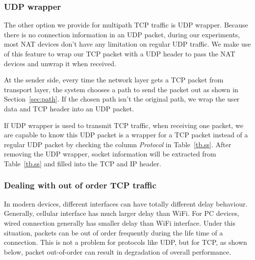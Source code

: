 \subsubsection{UDP wrapper}
The other option we provide for multipath TCP traffic is UDP wrapper. Because there is no connection information in an UDP packet, during our experiments, most NAT devices don't have any limitation on regular UDP traffic. We make use of this feature to wrap our TCP packet with a UDP header to pass the NAT devices and unwrap it when received.

At the sender side, every time the network layer gets a TCP packet from transport layer, the system chooses a path to send the packet out as shown in Section~\ref{sec:path}. If the chosen path isn't the original path, we wrap the user data and TCP header into an UDP packet. 

If UDP wrapper is used to transmit TCP traffic, when receiving one packet, we are capable to know this UDP packet is a wrapper for a TCP packet instead of a regular UDP packet by checking the column \emph{Protocol} in Table~\ref{tb.ss}. After removing the UDP wrapper, socket information will be extracted from Table~\ref{tb.ss} and filled into the TCP and IP header.


\subsubsection{Dealing with out of order TCP traffic}

In modern devices, different interfaces can have totally different delay behaviour. Generally, cellular interface has much larger delay than WiFi. For PC devices, wired connection generally has smaller delay than WiFi interface. Under this situation, packets can be out of order frequently during the life time of a connection. This is not a problem for protocols like UDP, but for TCP, as shown below, packet out-of-order can result in degradation of overall performance.

